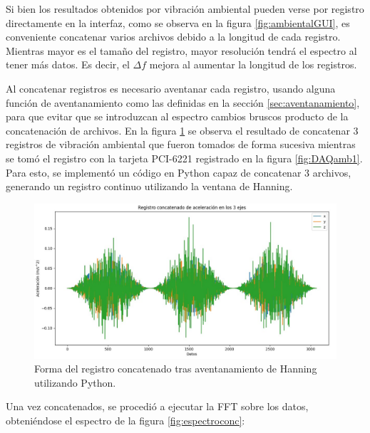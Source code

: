 Si bien los resultados obtenidos por vibración ambiental pueden verse por registro directamente en la interfaz, como se observa en la figura \ref{fig:ambientalGUI}, es conveniente concatenar varios archivos debido a la longitud de cada registro. Mientras mayor es el tamaño del registro, mayor resolución tendrá el espectro al tener más datos. Es decir, el $\Delta f$ mejora al aumentar la longitud de los registros.

Al concatenar registros es necesario aventanar cada registro, usando alguna función de aventanamiento como las definidas en la sección \ref{sec:aventanamiento}, para que evitar que se introduzcan al espectro cambios bruscos producto de la concatenación de archivos. En la figura \ref{fig:concatenados3} se observa el resultado de concatenar 3 registros de vibración ambiental que fueron tomados de forma sucesiva mientras se tomó el registro con la tarjeta PCI-6221 registrado en la figura \ref{fig:DAQamb1}. Para esto, se implementó un código en Python capaz de concatenar 3 archivos, generando un registro continuo utilizando la ventana de Hanning.

\begin{figure}[H]
    \centering
    \includegraphics[width = \textwidth]{imagenes/cap3_resultados/Ensayos/AmplitudVibAmb2CONCATENADASMARTSENSOR.jpg}
    \caption{Forma del registro concatenado tras aventanamiento de Hanning utilizando Python.}
    \label{fig:concatenados3}
\end{figure}

Una vez concatenados, se procedió a ejecutar la FFT sobre los datos, obteniéndose el espectro de la figura \ref{fig:espectroconc}:

